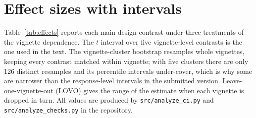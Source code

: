 \documentclass{article}
\begin{document}
\clearpage
\section{Effect sizes with intervals}
\label{app:effects}

Table~\ref{tab:effects} reports each main-design contrast under three treatments of the
vignette dependence. The $t$ interval over five vignette-level contrasts is the one used in
the text. The vignette-cluster bootstrap resamples whole vignettes, keeping every contrast
matched within vignette; with five clusters there are only 126 distinct resamples and its
percentile intervals under-cover, which is why some are narrower than the response-level
intervals in the submitted version. Leave-one-vignette-out (LOVO) gives the range of the
estimate when each vignette is dropped in turn. All values are produced by
\texttt{src/analyze\_ci.py} and \texttt{src/analyze\_checks.py} in the repository.
\end{document}
